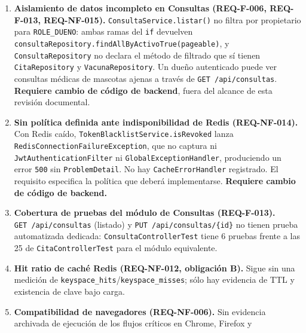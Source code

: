\documentclass[
  spanish,
]{article}
\providecommand{\tightlist}{%
  \setlength{\itemsep}{0pt}\setlength{\parskip}{0pt}}
\begin{document}
\begin{enumerate}
\def\labelenumi{\arabic{enumi}.}
\tightlist
\item
  \textbf{Aislamiento de datos incompleto en Consultas (REQ-F-006,
  REQ-F-013, REQ-NF-015).} \texttt{Consulta\allowbreak{}Service.\allowbreak{}listar()} no filtra
  por propietario para \texttt{ROLE\_\allowbreak{}DUENO}: ambas ramas del \texttt{if}
  devuelven \texttt{consulta\allowbreak{}Repository.\allowbreak{}find\allowbreak{}All\allowbreak{}By\allowbreak{}Activo\allowbreak{}True(pageable)}, y
  \texttt{Consulta\allowbreak{}Repository} no declara el método de filtrado que sí
  tienen \texttt{Cita\allowbreak{}Repository} y \texttt{Vacuna\allowbreak{}Repository}. Un dueño
  autenticado puede ver consultas médicas de mascotas ajenas a través de
  \texttt{GET\ /\allowbreak{}api/\allowbreak{}consultas}. \textbf{Requiere cambio de código de
  backend}, fuera del alcance de esta revisión documental.
\item
  \textbf{Sin política definida ante indisponibilidad de Redis
  (REQ-NF-014).} Con Redis caído,
  \texttt{Token\allowbreak{}Blacklist\allowbreak{}Service.\allowbreak{}is\allowbreak{}Revoked} lanza
  \texttt{Redis\allowbreak{}Connection\allowbreak{}Failure\allowbreak{}Exception}, que no captura ni
  \texttt{Jwt\allowbreak{}Authentication\allowbreak{}Filter} ni \texttt{Global\allowbreak{}Exception\allowbreak{}Handler},
  produciendo un error \texttt{500} sin \texttt{Problem\allowbreak{}Detail}. No hay
  \texttt{Cache\allowbreak{}Error\allowbreak{}Handler} registrado. El requisito especifica la
  política que deberá implementarse. \textbf{Requiere cambio de código
  de backend.}
\item
  \textbf{Cobertura de pruebas del módulo de Consultas (REQ-F-013).}
  \texttt{GET\ /\allowbreak{}api/\allowbreak{}consultas} (listado) y
  \texttt{PUT\ /\allowbreak{}api/\allowbreak{}consultas/\allowbreak{}\{id\}} no tienen prueba automatizada
  dedicada: \texttt{Consulta\allowbreak{}Controller\allowbreak{}Test} tiene 6 pruebas frente a las
  25 de \texttt{Cita\allowbreak{}Controller\allowbreak{}Test} para el módulo equivalente.
\item
  \textbf{Hit ratio de caché Redis (REQ-NF-012, obligación B).} Sigue
  sin una medición de \texttt{keyspace\_\allowbreak{}hits}/\texttt{keyspace\_\allowbreak{}misses};
  sólo hay evidencia de TTL y existencia de clave bajo carga.
\item
  \textbf{Compatibilidad de navegadores (REQ-NF-006).} Sin evidencia
  archivada de ejecución de los flujos críticos en Chrome, Firefox y

\end{enumerate}
\end{document}
